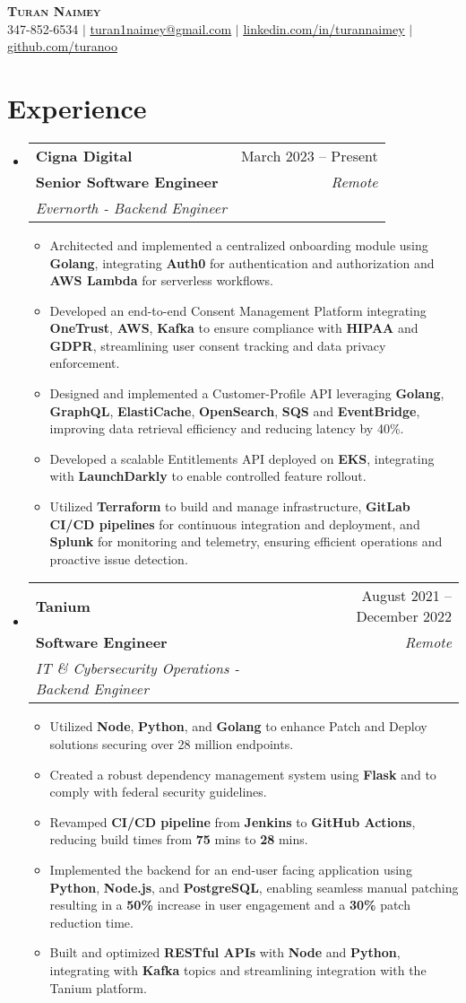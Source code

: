 \documentclass[letterpaper,11pt]{article}
\makeatletter
\newcommand{\resumeItem}[1]{
  \item\small{
    {#1 \vspace{-2pt}}
  }
}
\newcommand{\resumeSubheading}[5]{
  \vspace{-2pt}\item
    \begin{tabular*}{0.97\textwidth}[t]{l@{\extracolsep{\fill}}r}
      \textbf{#1} & #2 \\
      \textbf{\small#3} & \textit{\small #4} \\
      \textit{\small#5} \\
    \end{tabular*}\vspace{-7pt}
}
\newcommand{\resumeSubHeadingListStart}{\begin{itemize}[leftmargin=0.15in, label={}]}
\newcommand{\resumeSubHeadingListEnd}{\end{itemize}}
\newcommand{\resumeItemListStart}{\begin{itemize}}
\newcommand{\resumeItemListEnd}{\end{itemize}\vspace{-5pt}}
\makeatother
\begin{document}
\begin{center}
 \textbf{\Huge \scshape Turan Naimey} \\ \vspace{1pt}
 \small 347-852-6534 $|$ \href{mailto:turan1naimey@gmail.com}{\underline{turan1naimey@gmail.com}} $|$
 \href{https://linkedin.com/in/turannaimey}{\underline{linkedin.com/in/turannaimey}} $|$
 \href{https://github.com/turanoo}{\underline{github.com/turanoo}}
\end{center}

\section{Experience}

\resumeSubHeadingListStart
\resumeSubheading
{Cigna Digital}{March 2023 -- Present}
{Senior Software Engineer}{Remote}
{Evernorth - Backend Engineer}
\resumeItemListStart
\resumeItem{Architected and implemented a centralized onboarding module using \textbf{Golang}, integrating \textbf{Auth0} for authentication and authorization and \textbf{AWS Lambda} for serverless workflows.}
\resumeItem{Developed an end-to-end Consent Management Platform integrating \textbf{OneTrust}, \textbf{AWS}, \textbf{Kafka} to ensure compliance with \textbf{HIPAA} and \textbf{GDPR}, streamlining user consent tracking and data privacy enforcement.}
\resumeItem{Designed and implemented a Customer-Profile API leveraging \textbf{Golang}, \textbf{GraphQL}, \textbf{ElastiCache}, \textbf{OpenSearch}, \textbf{SQS} and \textbf{EventBridge},   improving data retrieval efficiency and reducing latency by 40\%. }
\resumeItem{Developed a scalable Entitlements API deployed on \textbf{EKS}, integrating with \textbf{LaunchDarkly} to enable controlled feature rollout.}
\resumeItem{Utilized \textbf{Terraform} to build and manage infrastructure, \textbf{GitLab CI/CD pipelines} for continuous integration and deployment, and \textbf{Splunk} for monitoring and telemetry, ensuring efficient operations and proactive issue detection.}
\resumeItemListEnd
\resumeSubHeadingListEnd


\resumeSubHeadingListStart
\resumeSubheading
{Tanium}{August 2021 -- December 2022}
{Software Engineer}{Remote}
{IT \& Cybersecurity Operations - Backend Engineer}
\resumeItemListStart
\resumeItem{Utilized \textbf{Node}, \textbf{Python}, and \textbf{Golang} to enhance Patch and Deploy solutions securing over 28 million endpoints.}
\resumeItem{Created a robust dependency management system using \textbf{Flask} and  to comply with federal security guidelines.}
\resumeItem{Revamped \textbf{CI/CD pipeline} from \textbf{Jenkins} to \textbf{GitHub Actions}, reducing build times from \textbf{75} mins to \textbf{28} mins.}
\resumeItem{Implemented the backend for an end-user facing application using \textbf{Python}, \textbf{Node.js}, and \textbf{PostgreSQL}, enabling seamless manual patching resulting in a \textbf{50\%} increase in user engagement and a \textbf{30\%} patch reduction time.}
\resumeItem{Built and optimized \textbf{RESTful APIs} with \textbf{Node} and \textbf{Python}, integrating with \textbf{Kafka} topics and streamlining integration with the Tanium platform.}
\resumeItemListEnd
\resumeSubHeadingListEnd
\end{document}
